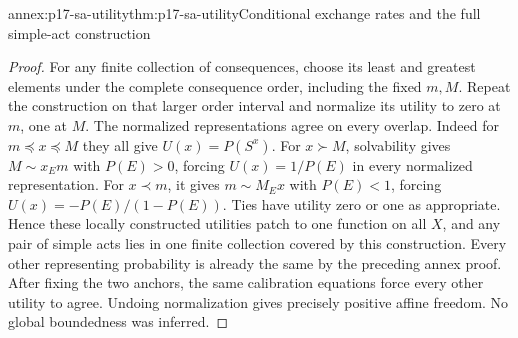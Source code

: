 \begin{annexitem}{annex:p17-sa-utility}{thm:p17-sa-utility}{Conditional exchange rates and the full simple-act construction}
\begin{proof}
For any finite collection of consequences, choose its
least and greatest elements under the complete consequence
order, including the fixed \(m,M\). Repeat the construction
on that larger order interval and normalize its utility
to zero at \(m\), one at \(M\).
The normalized representations agree on every overlap.
Indeed for \(m\preceq x\preceq M\) they all give
\(U(x)=P(S^x)\).
For \(x\succ M\), solvability gives
\(M\sim x_Em\) with \(P(E)>0\), forcing
\(U(x)=1/P(E)\) in every normalized representation.
For \(x\prec m\), it gives
\(m\sim M_Ex\) with \(P(E)<1\), forcing
\(U(x)=-P(E)/(1-P(E))\).
Ties have utility zero or one as appropriate.
Hence these locally constructed utilities patch to one
function on all \(X\), and any pair of simple acts lies
in one finite collection covered by this construction.
Every other representing probability is already the same
by the preceding annex proof. After fixing the two anchors,
the same calibration equations force every other utility
to agree. Undoing normalization gives precisely positive
affine freedom. No global boundedness was inferred.
\end{proof}
\end{annexitem}


